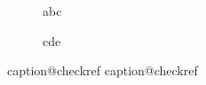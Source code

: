 \documentclass{article}
\begin{document}
\begin{figure}
\caption{abc}\label{abc}
\end{figure}

\begin{figure}
\ContinuedFloat
\caption{cde}\label{cde}
\end{figure}

\csname caption@checkref
\csname caption@checkref
\end{document}
